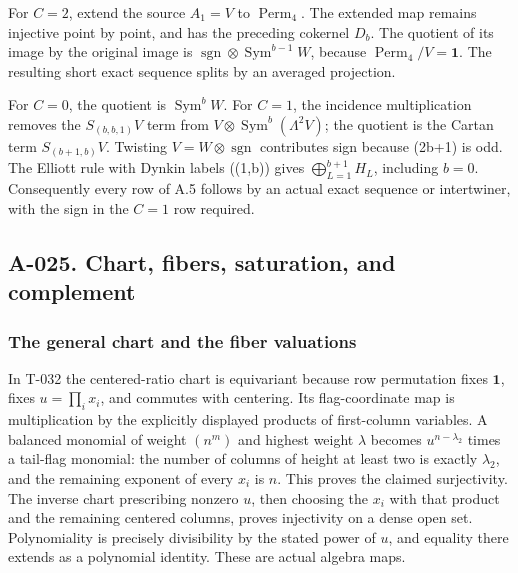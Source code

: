 \documentclass[
  10pt,
]{article}
\begin{document}
For \(C=2\), extend the source \(A_1=V\) to \(\operatorname{Perm}_4\).
The extended map remains injective point by point, and has the preceding
cokernel \(D_b\). The quotient of its image by the original image is
\(\operatorname{sgn}\otimes\operatorname{Sym}^{b-1}W\), because
\(\operatorname{Perm}_4/V=\mathbf1\). The resulting short exact sequence
splits by an averaged projection.

For \(C=0\), the quotient is \(\operatorname{Sym}^bW\). For \(C=1\), the
incidence multiplication removes the \(S_{(b,b,1)}V\) term from
\(V\otimes\operatorname{Sym}^b(\Lambda^2V)\); the quotient is the Cartan
term \(S_{(b+1,b)}V\). Twisting \(V=W\otimes\operatorname{sgn}\)
contributes sign because (2b+1) is odd. The Elliott rule with Dynkin
labels ((1,b)) gives \(\bigoplus_{L=1}^{b+1}H_L\), including \(b=0\).
Consequently every row of A.5 follows by an actual exact sequence or
intertwiner, with the sign in the \(C=1\) row required.

\subsection{A-025. Chart, fibers, saturation, and
complement}\label{a-025.-chart-fibers-saturation-and-complement}

\subsubsection{The general chart and the fiber
valuations}\label{the-general-chart-and-the-fiber-valuations}

In T-032 the centered-ratio chart is equivariant because row permutation
fixes \(\mathbf1\), fixes \(u=\prod_i x_i\), and commutes with
centering. Its flag-coordinate map is multiplication by the explicitly
displayed products of first-column variables. A balanced monomial of
weight \((n^m)\) and highest weight \(\lambda\) becomes
\(u^{n-\lambda_2}\) times a tail-flag monomial: the number of columns of
height at least two is exactly \(\lambda_2\), and the remaining exponent
of every \(x_i\) is \(n\). This proves the claimed surjectivity. The
inverse chart prescribing nonzero \(u\), then choosing the \(x_i\) with
that product and the remaining centered columns, proves injectivity on a
dense open set. Polynomiality is precisely divisibility by the stated
power of \(u\), and equality there extends as a polynomial identity.
These are actual algebra maps.
\end{document}
